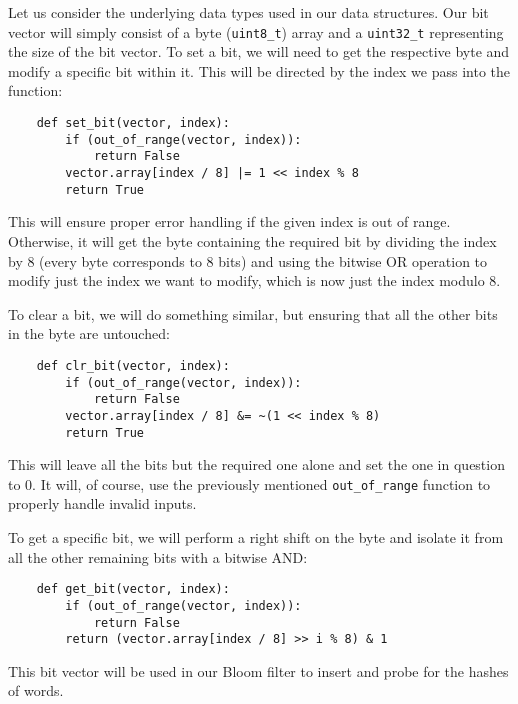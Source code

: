 \documentclass[12pt]{article}
\begin{document}
Let us consider the underlying data types used in our data structures. Our bit vector will simply consist of a byte (\verb|uint8_t|) array and a \verb|uint32_t| representing the size of the bit vector. To set a bit, we will need to get the respective byte and modify a specific bit within it. This will be directed by the index we pass into the function:
\begin{verbatim}
    def set_bit(vector, index):
        if (out_of_range(vector, index)):
            return False
        vector.array[index / 8] |= 1 << index % 8
        return True
\end{verbatim}
This will ensure proper error handling if the given index is out of range. Otherwise, it will get the byte containing the required bit by dividing the index by 8 (every byte corresponds to 8 bits) and using the bitwise OR operation to modify just the index we want to modify, which is now just the index modulo 8.

To clear a bit, we will do something similar, but ensuring that all the other bits in the byte are untouched:
\begin{verbatim}
    def clr_bit(vector, index):
        if (out_of_range(vector, index)):
            return False
        vector.array[index / 8] &= ~(1 << index % 8)
        return True
\end{verbatim}
This will leave all the bits but the required one alone and set the one in question to 0. It will, of course, use the previously mentioned \verb|out_of_range| function to properly handle invalid inputs.

To get a specific bit, we will perform a right shift on the byte and isolate it from all the other remaining bits with a bitwise AND:
\begin{verbatim}
    def get_bit(vector, index):
        if (out_of_range(vector, index)):
            return False
        return (vector.array[index / 8] >> i % 8) & 1
\end{verbatim}
This bit vector will be used in our Bloom filter to insert and probe for the hashes of words.
\end{document}
